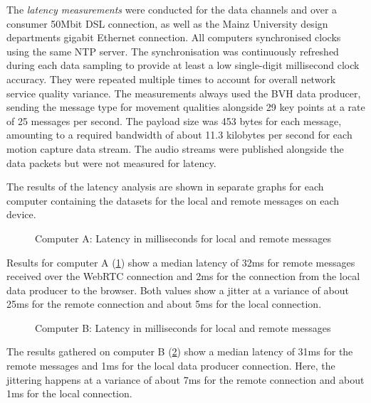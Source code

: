 The \emph{latency measurements} were conducted for the data channels and over a consumer 50Mbit \ac{DSL} connection, as well as the Mainz University design department\textquotesingle s gigabit Ethernet connection.
All computers synchronised clocks using the same \ac{NTP} server. The synchronisation was continuously refreshed during each data sampling to provide at least a low single-digit millisecond clock accuracy.
They were repeated multiple times to account for overall network service quality variance.
The measurements always used the \ac{BVH} data producer, sending the message type for movement qualities alongside 29 key points at a rate of 25 messages per second.
The payload size was 453 bytes for each message, amounting to a required bandwidth of about 11.3 kilobytes per second for each motion capture data stream.
The audio streams were published alongside the data packets but were not measured for latency.

The results of the latency analysis are shown in separate graphs for each computer containing the datasets for the local and remote messages on each device.

\begin{figure}[h]
\centering

\caption[Message latency on Computer A]{Computer A: Latency in milliseconds for local and remote messages\protect}
\label{fig:latencyComputerA}
\end{figure}

Results for computer A (\ref{fig:latencyComputerA}) show a median latency of 32ms for remote messages received over the WebRTC connection and 2ms for the connection from the local data producer to the browser.
Both values show a jitter at a variance of about 25ms for the remote connection and about 5ms for the local connection.

\begin{figure}[h]
\centering

\caption[Message latency on Computer B]{Computer B: Latency in milliseconds for local and remote messages\protect}
\label{fig:latencyComputerB}
\end{figure}

The results gathered on computer B (\ref{fig:latencyComputerB}) show a median latency of 31ms for the remote messages and 1ms for the local data producer connection.
Here, the jittering happens at a variance of about 7ms for the remote connection and about 1ms for the local connection.

